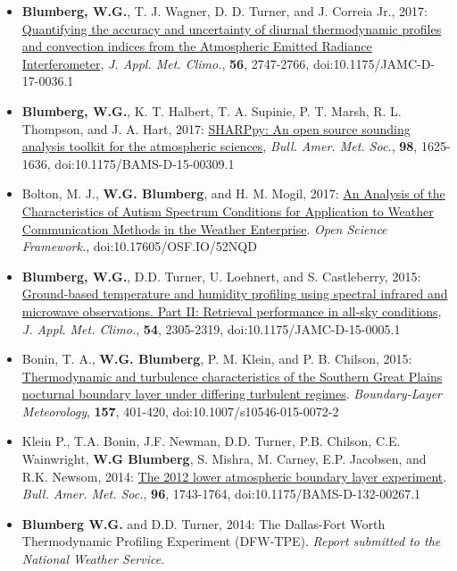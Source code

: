 \documentclass[10pt]{res} %
\begin{document}
\begin{resume}
\vspace{15pt} %
\begin{itemize} \itemsep 2pt %
\item \textbf{Blumberg, W.G.}, T. J. Wagner, D. D. Turner, and J. Correia Jr., 2017: \href{http://journals.ametsoc.org/doi/abs/10.1175/JAMC-D-17-0036.1}{Quantifying the accuracy and uncertainty of diurnal thermodynamic profiles and convection indices from the Atmospheric Emitted Radiance Interferometer}, \emph{J. Appl. Met. Climo.}, \textbf{56}, 2747-2766, doi:10.1175/JAMC-D-17-0036.1
\item \textbf{Blumberg, W.G.}, K. T. Halbert, T. A. Supinie, P. T. Marsh, R. L. Thompson, and J. A. Hart, 2017: \href{http://journals.ametsoc.org/doi/abs/10.1175/BAMS-D-15-00309.1}{SHARPpy: An open source sounding analysis toolkit for the atmospheric sciences}, \emph{Bull. Amer. Met. Soc.}, \textbf{98}, 1625-1636, doi:10.1175/BAMS-D-15-00309.1
\item Bolton, M. J., \textbf{W.G. Blumberg}, and H. M. Mogil, 2017: \href{https://osf.io/52nqd}{An Analysis of the Characteristics of Autism Spectrum Conditions for Application to Weather Communication Methods in the Weather Enterprise}. \emph{Open Science Framework.}, doi:10.17605/OSF.IO/52NQD
\item \textbf{Blumberg, W.G.}, D.D. Turner, U. Loehnert, and S. Castleberry, 2015: \href{http://journals.ametsoc.org/doi/abs/10.1175/JAMC-D-15-0005.1}{Ground-based temperature and humidity profiling using spectral infrared and microwave observations.  Part II: Retrieval performance in all-sky conditions}, \emph{J. Appl. Met. Climo.}, \textbf{54}, 2305-2319, doi:10.1175/JAMC-D-15-0005.1
\item Bonin, T. A., \textbf{W.G. Blumberg}, P. M. Klein, and P. B. Chilson, 2015: \href{http://link.springer.com/article/10.1007/s10546-015-0072-2}{Thermodynamic and turbulence characteristics of the Southern Great Plains nocturnal boundary layer under differing turbulent regimes}. \emph{Boundary-Layer Meteorology}, \textbf{157}, 401-420, doi:10.1007/s10546-015-0072-2
\item Klein P., T.A. Bonin, J.F. Newman,  D.D. Turner, P.B. Chilson, C.E. Wainwright, \textbf{W.G Blumberg}, S. Mishra, M. Carney,  E.P. Jacobsen, and R.K. Newsom, 2014: \href{http://journals.ametsoc.org/doi/abs/10.1175/BAMS-D-13-00267.1}{The 2012 lower atmospheric boundary layer experiment}. \emph{Bull. Amer. Met. Soc.}, \textbf{96}, 1743-1764, doi:10.1175/BAMS-D-132-00267.1
\item \textbf{Blumberg W.G.} and D.D. Turner, 2014: The Dallas-Fort Worth Thermodynamic Profiling Experiment (DFW-TPE). \emph{Report submitted to the National Weather Service}.
\end{itemize}



\end{resume}
\end{document}
